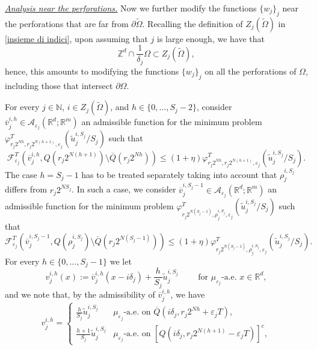 \documentclass{article}
\theoremstyle{plain}
\theoremstyle{definition}
\def\rr{{\mathbb R}}
\def\NN{{\mathbb N}}
\def\ZZ{{\mathbb Z}}
\newcommand{\f}{\varphi}
\newcommand{\ej}{\varepsilon_j}
\newcommand{\rj}{r_j}
\newcommand{\dej}{\delta_j}
\newcommand{\A}{\mathcal{A}}
\newcommand{\F}{\mathcal{F}}
\newcommand{\Q}
{\overline{Q}}
\numberwithin{equation}{section}
\begin{document}
\smallskip

\underline{{\it Analysis near the perforations.}} Now we further modify the functions $\{w_j\}_j$ near the perforations that are far from $\partial \widetilde{\Omega}$. Recalling the definition of $Z_j(\widetilde{\Omega})$ in \eqref{insieme di indici}, upon assuming that $j$ is large enough, we have that
\begin{equation*}
\ZZ^d\cap \frac{1}{\dej}\Omega \subset Z_j(\widetilde{\Omega}),
\end{equation*} 
hence, this amounts to modifying the functions $\{w_j\}_j$ on all the perforations of $\Omega$, including those that intersect $\partial\Omega$.

For every $j\in\NN$, $i\in Z_j(\widetilde{\Omega})$, and $h\in\{0,\dots,S_j-2\}$, consider $\overline{v}^{i,h}_j\in\A_{\ej}(\rr^d;\rr^m)$ an admissible function for the minimum problem $\f^T_{\rj2^{Nh},\rj2^{N(h+1)}, \ej}(\widetilde{u}^{i,S_j}_j/S_j)$ such that
\begin{equation}\label{funzione ottimale limsup}
    \F_{\ej}^T(\overline{v}^{i,h}_j, Q(\rj 2^{N(h+1)})\setminus \Q(\rj 2^{Nh})) \leq (1+\eta)\f^T_{\rj2^{Nh},\rj2^{N(h+1)}, \ej}(\widetilde{u}^{i,S_j}_j/S_j).
\end{equation}
The case $h=S_j-1$ has to be treated separately taking into account that $\rho_j^{i,S_j}$ differs from $r_j2^{NS_j}$. In such a case, we consider $\overline{v}^{i,S_j-1}_j\in\A_{\ej}(\rr^d;\rr^m)$ an admissible function for the minimum problem $\f^T_{\rj2^{N(S_j-1)},\rho^{i,S_j}_j,\ej}(\widetilde{u}^{i,S_j}_j/S_j)$ such that
\begin{equation}\label{funzione ottimale limsup bis}
    \F_{\ej}^T(\overline{v}^{i,S_j-1}_j, Q(\rho_j^{i,S_j})\setminus \Q(\rj 2^{N(S_j-1)})) \leq (1+\eta)\f^T_{\rj2^{N(S_j-1)},\rho^{i,S_j}_j,\ej}(\widetilde{u}^{i,S_j}_j/S_j).
\end{equation}
For every $h\in\{0,\dots,S_j-1\}$ we let 
\begin{equation*}
v^{i,h}_j(x):=\overline{v}_j^{i,h}(x-i\dej)+\frac{h}{S_j}\widetilde{u}^{i,S_j}_j  \qquad \text{ for } \mu_{\ej} \text{-a.e. }x\in \rr^d,
\end{equation*}
and we note that, by the admissibility of $\overline{v}_j^{i,h}$, we have
\begin{equation*}
v^{i,h}_j=
     \begin{cases}
  \displaystyle\frac{h}{S_j}\widetilde{u}^{i,S_j}_j &  \mu_{\ej} \text{-a.e. on }\Q(i\dej,\rj 2^{Nh}+\ej T),\\[10pt]
   \displaystyle\frac{h+1}{S_j}\widetilde{u}^{i,S_j}_j & \mu_{\ej} \text{-a.e. on } [Q(i\dej, \rj2^{N(h+1)}-\ej T)]^c,
    \end{cases}
\end{equation*}
\end{document}
